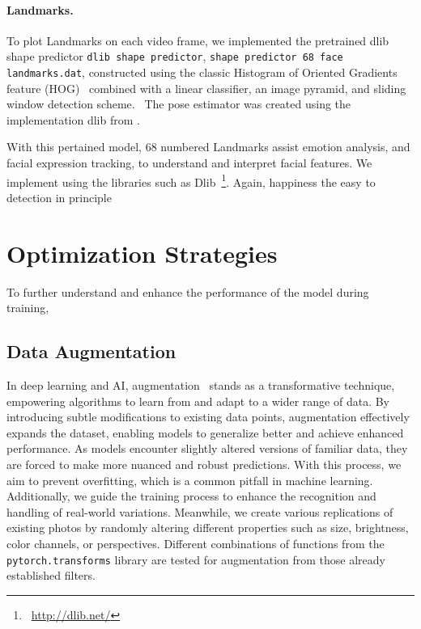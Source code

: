 \paragraph{Landmarks.}
To plot Landmarks on each video frame, we implemented the pretrained dlib shape predictor 
\texttt{dlib shape predictor}, %
\texttt{shape predictor 68 face landmarks.dat}, 
constructed using the classic Histogram of Oriented Gradients feature (HOG)~\cite{1467360} combined with a linear classifier, 
an image pyramid, and sliding window detection scheme.~\cite{dlib_site}
The pose estimator was created using the implementation dlib from \citet{6909637}.

With this pertained model, 68 numbered Landmarks assist emotion analysis, 
and facial expression tracking, to understand and interpret facial features.
We implement using the libraries such as Dlib~\footnote{~\url{http://dlib.net/}}. %
Again,  happiness the easy to detection in principle 



\section{Optimization Strategies}
\label{sec:optim}

To further understand and enhance the performance of the model during training, 

\subsection{Data Augmentation}
\label{sec:optim:aug}

In deep learning and AI, 
augmentation~\cite{augment} stands as a transformative technique, 
empowering algorithms to learn from and adapt to a wider range of data. 
By introducing subtle modifications to existing data points, 
augmentation effectively expands the dataset, 
enabling models to generalize better and achieve enhanced performance. 
As models encounter slightly altered versions of familiar data, 
they are forced to make more nuanced and robust predictions. 
With this process, we aim to prevent overfitting, which is a common pitfall in machine learning. 
Additionally, we guide the training process to enhance the recognition and handling of real-world variations.
Meanwhile, we create various replications of existing photos by randomly altering different properties such as size, brightness, color channels, or perspectives.
Different combinations of functions from the \texttt{pytorch.transforms} library are tested for augmentation from those already established filters. 

